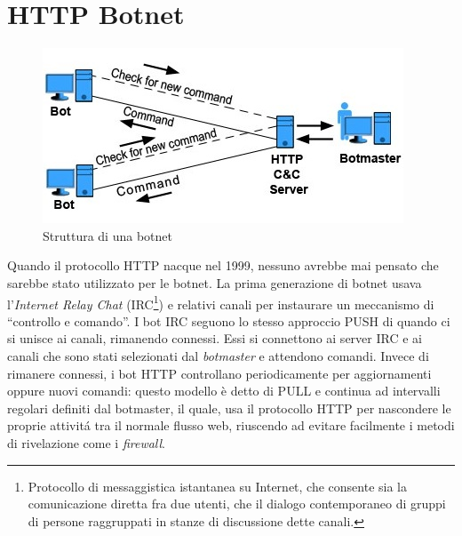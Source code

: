 \vspace*{1cm}
\section{HTTP Botnet}
\begin{figure}[h]
        \centering
		\includegraphics[width=0.5\linewidth]{./imgs/botnet1999}
        \caption{Struttura di una botnet}
        \label{strutturabotnet}
\end{figure}
Quando il protocollo HTTP nacque nel 1999, nessuno avrebbe mai pensato che sarebbe stato utilizzato per le botnet. 
La prima generazione di botnet usava l'\textit{Internet Relay Chat} (IRC\footnote{Protocollo di messaggistica istantanea su Internet, che consente sia la comunicazione diretta fra due utenti, che il dialogo contemporaneo di gruppi di persone raggruppati in stanze di discussione dette canali.}) e relativi canali per instaurare un meccanismo di ``controllo e comando''. I bot IRC seguono lo stesso approccio PUSH di quando ci si unisce ai canali, rimanendo connessi. Essi si connettono ai server IRC e ai canali che sono stati selezionati dal \textit{botmaster} e attendono comandi. 
Invece di rimanere connessi, i bot HTTP controllano periodicamente per aggiornamenti oppure nuovi comandi: questo modello \`e detto di PULL e continua ad intervalli regolari definiti dal botmaster, il quale, usa il protocollo HTTP per nascondere le proprie attivit\'a tra il normale flusso web, riuscendo ad evitare facilmente i metodi di rivelazione come i \textit{firewall}. 

\vspace*{1cm}
